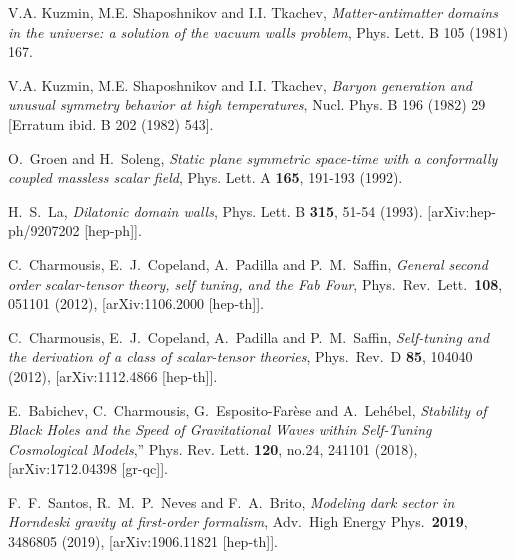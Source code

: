 \documentclass[aps,12pt, a4paper,nofootinbib]{revtex4}
\begin{document}
{\begin{thebibliography}{99}
V.A. Kuzmin, M.E. Shaposhnikov and I.I. Tkachev,
{\it Matter-antimatter domains in the universe: a solution of the vacuum walls problem},
 Phys. Lett. B 105 (1981) 167.

V.A. Kuzmin, M.E. Shaposhnikov and I.I. Tkachev,
{\it Baryon generation and unusual symmetry behavior at high temperatures},
Nucl. Phys. B 196 (1982) 29 [Erratum ibid. B 202 (1982) 543].

O.~Groen and H.~Soleng,
{\it Static plane symmetric space-time with a conformally coupled massless scalar field},
Phys. Lett. A \textbf{165}, 191-193 (1992).

H.~S.~La,
{\it Dilatonic domain walls},
Phys. Lett. B \textbf{315}, 51-54 (1993).
[arXiv:hep-ph/9207202 [hep-ph]].

  C.~Charmousis, E.~J.~Copeland, A.~Padilla and P.~M.~Saffin,
  {\it General second order scalar-tensor theory, self tuning, and the Fab Four},
  Phys.\ Rev.\ Lett.\  {\bf 108}, 051101 (2012), [arXiv:1106.2000 [hep-th]].

  C.~Charmousis, E.~J.~Copeland, A.~Padilla and P.~M.~Saffin,
  {\it Self-tuning and the derivation of a class of scalar-tensor theories},
  Phys.\ Rev.\ D {\bf 85}, 104040 (2012), [arXiv:1112.4866 [hep-th]].
  
E.~Babichev, C.~Charmousis, G.~Esposito-Far\`ese and A.~Leh\'ebel,
{\it Stability of Black Holes and the Speed of Gravitational Waves within Self-Tuning Cosmological Models},''
Phys. Rev. Lett. \textbf{120}, no.24, 241101 (2018),
[arXiv:1712.04398 [gr-qc]].

  F.~F.~Santos, R.~M.~P.~Neves and F.~A.~Brito,
  {\it Modeling dark sector in Horndeski gravity at first-order formalism},
  Adv.\ High Energy Phys.\  {\bf 2019}, 3486805 (2019),
  [arXiv:1906.11821 [hep-th]].


\end{thebibliography}}
\end{document}
